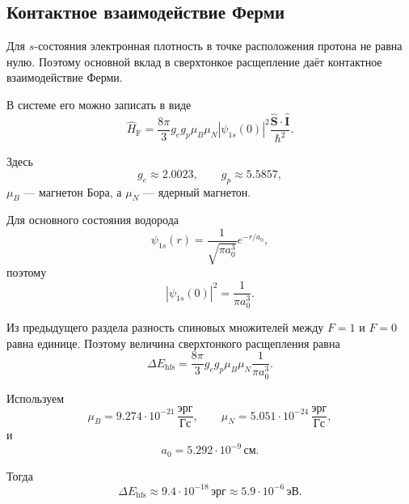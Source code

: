 \documentclass[../final.tex]{subfiles}
\begin{document}
\subsection*{Контактное взаимодействие Ферми}

Для $s$-состояния электронная плотность в точке расположения протона
не равна нулю. Поэтому основной вклад в сверхтонкое расщепление
даёт контактное взаимодействие Ферми.

В системе  его можно записать в виде
%
\begin{equation*}
    \hat H_{\mathrm{F}}
    =
    \frac{8\pi}{3}
    g_e g_p\mu_B\mu_N
    |\psi_{1s}(0)|^2
    \frac{\hat{\mathbf S}\cdot\hat{\mathbf I}}{\hbar^2}.
\end{equation*}

Здесь
%
\begin{equation*}
    g_e\approx2.0023,
    \qquad
    g_p\approx5.5857,
\end{equation*}
%
$\mu_B$ --- магнетон Бора, а $\mu_N$ --- ядерный магнетон.

Для основного состояния водорода
%
\begin{equation*}
    \psi_{1s}(r)
    =
    \frac{1}{\sqrt{\pi a_0^3}}
    e^{-r/a_0},
\end{equation*}
%
поэтому
%
\begin{equation*}
    |\psi_{1s}(0)|^2
    =
    \frac{1}{\pi a_0^3}.
\end{equation*}

Из предыдущего раздела разность спиновых множителей между $F=1$
и $F=0$ равна единице. Поэтому величина сверхтонкого расщепления
равна
%
\begin{equation*}
    \Delta E_{\mathrm{hfs}}
    =
    \frac{8\pi}{3}
    g_e g_p\mu_B\mu_N
    \frac{1}{\pi a_0^3}.
\end{equation*}

Используем
%
\begin{equation*}
    \mu_B
    =
    9.274\cdot10^{-21}\,
    \frac{\text{эрг}}{\text{Гс}},
    \qquad
    \mu_N
    =
    5.051\cdot10^{-24}\,
    \frac{\text{эрг}}{\text{Гс}},
\end{equation*}
%
и
%
\begin{equation*}
    a_0
    =
    5.292\cdot10^{-9}\,\text{см}.
\end{equation*}

Тогда
%
\begin{equation*}
    \Delta E_{\mathrm{hfs}}
    \approx
    9.4\cdot10^{-18}\,\text{эрг}
    \approx
    5.9\cdot10^{-6}\,\text{эВ}.
\end{equation*}
\end{document}
